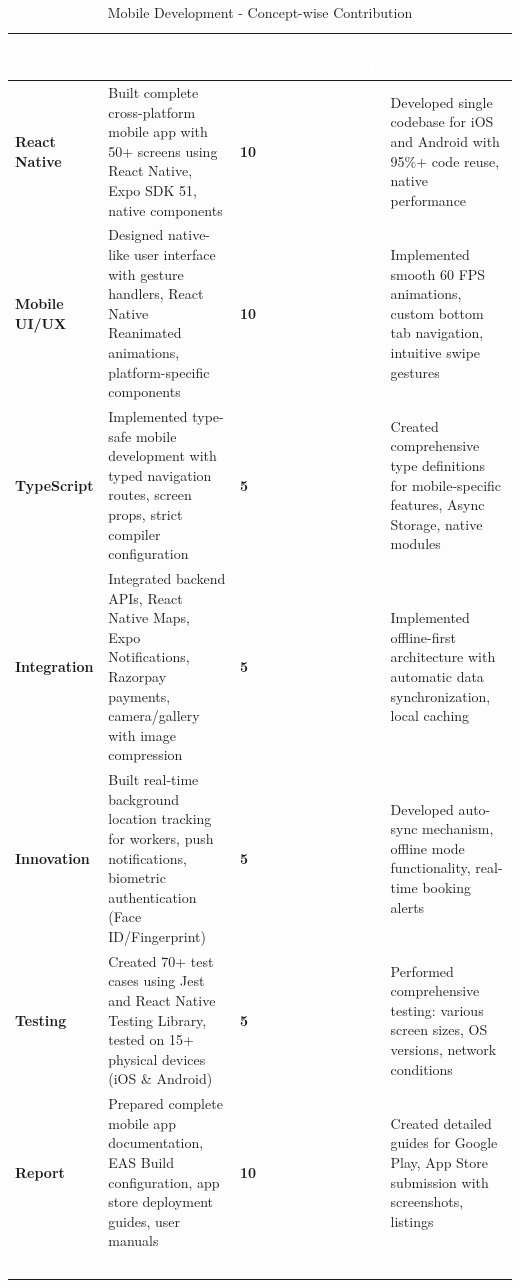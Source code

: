 \documentclass[12pt,a4paper]{article}
\begin{document}
\begin{table}[h!]
\centering
\renewcommand{\arraystretch}{1.4}
\begin{tabular}{|p{2.5cm}|p{4.5cm}|>{\centering\arraybackslash}p{2cm}|>{\centering\arraybackslash}p{2cm}|p{4cm}|}
\hline
\rowcolor{headerblue}
\textcolor{white}{\textbf{Concept}} & 
\textcolor{white}{\textbf{Contribution}} & 
\textcolor{white}{\textbf{Marks Allotted}} & 
\textcolor{white}{\textbf{Marks Awarded}} & 
\textcolor{white}{\textbf{Additional Info}} \\
\hline
\rowcolor{lightgray}
\textbf{React Native} & Built complete cross-platform mobile app with 50+ screens using React Native, Expo SDK 51, native components & \textbf{10} & & Developed single codebase for iOS and Android with 95\%+ code reuse, native performance \\
\hline

\textbf{Mobile UI/UX} & Designed native-like user interface with gesture handlers, React Native Reanimated animations, platform-specific components & \textbf{10} & & Implemented smooth 60 FPS animations, custom bottom tab navigation, intuitive swipe gestures \\
\hline
\rowcolor{lightgray}
\textbf{TypeScript} & Implemented type-safe mobile development with typed navigation routes, screen props, strict compiler configuration & \textbf{5} & & Created comprehensive type definitions for mobile-specific features, Async Storage, native modules \\
\hline

\textbf{Integration} & Integrated backend APIs, React Native Maps, Expo Notifications, Razorpay payments, camera/gallery with image compression & \textbf{5} & & Implemented offline-first architecture with automatic data synchronization, local caching \\
\hline
\rowcolor{lightgray}
\textbf{Innovation} & Built real-time background location tracking for workers, push notifications, biometric authentication (Face ID/Fingerprint) & \textbf{5} & & Developed auto-sync mechanism, offline mode functionality, real-time booking alerts \\
\hline

\textbf{Testing} & Created 70+ test cases using Jest and React Native Testing Library, tested on 15+ physical devices (iOS \& Android) & \textbf{5} & & Performed comprehensive testing: various screen sizes, OS versions, network conditions \\
\hline
\rowcolor{lightgray}
\textbf{Report} & Prepared complete mobile app documentation, EAS Build configuration, app store deployment guides, user manuals & \textbf{10} & & Created detailed guides for Google Play, App Store submission with screenshots, listings \\
\hline
\hline
\rowcolor{headerblue}
\multicolumn{2}{|r|}{\textcolor{white}{\textbf{TOTAL}}} & \textcolor{white}{\textbf{50}} & & \\
\hline
\end{tabular}
\caption{Mobile Development - Concept-wise Contribution}
\renewcommand{\arraystretch}{1}
\end{table}
\end{document}
